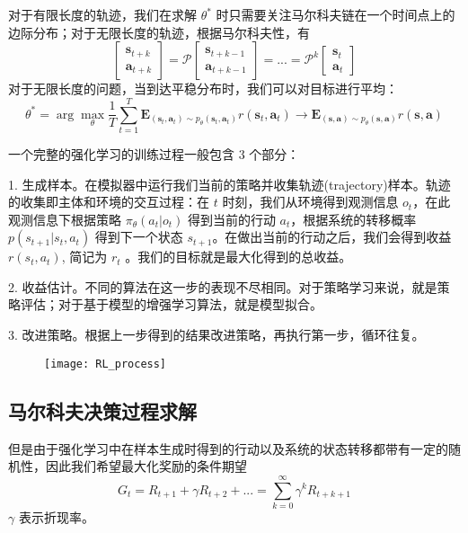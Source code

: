 对于有限长度的轨迹，我们在求解 $\theta^*$ 时只需要关注马尔科夫链在一个时间点上的边际分布；对于无限长度的轨迹，根据马尔科夫性，有
$$\left[\begin{array}{l}\mathbf{s}_{t+k}\\\mathbf{a}_{t+k}\end{array}\right]=\mathcal{P}\left[\begin{array}{l}\mathbf{s}_{t+k-1}\\\mathbf{a}_{t+k-1}\end{array}\right]=...=\mathcal{P}^k\left[\begin{array}{l}\mathbf{s}_{t}\\\mathbf{a}_{t}\end{array}\right]$$
对于无限长度的问题，当到达平稳分布时，我们可以对目标进行平均：
$$
\theta^*=\arg\max_\theta\frac{1}{T}\sum_{t=1}^T\mathbf{E}_{(\mathbf{s}_t,\mathbf{a}_t)\sim p_\theta(\mathbf{s}_t,\mathbf{a}_t)}r(\mathbf{s}_t,\mathbf{a}_t)\rightarrow \mathbf{E}_{(\mathbf{s},\mathbf{a})\sim p_\theta(\mathbf{s},\mathbf{a})}r(\mathbf{s},\mathbf{a})
$$

一个完整的强化学习的训练过程一般包含 3 个部分：

1. 生成样本。在模拟器中运行我们当前的策略并收集轨迹(trajectory)样本。轨迹的收集即主体和环境的交互过程：在 $t$ 时刻，我们从环境得到观测信息 $o_t$，在此观测信息下根据策略 $\pi_\theta(a_t|o_t)$ 得到当前的行动 $a_t$，根据系统的转移概率 $p(s_{t+1}|s_t, a_t)$ 得到下一个状态 $s_{t+1}$。在做出当前的行动之后，我们会得到收益 $r(s_t,a_t)$, 简记为 $r_t$ 。我们的目标就是最大化得到的总收益。

2. 收益估计。不同的算法在这一步的表现不尽相同。对于策略学习来说，就是策略评估；对于基于模型的增强学习算法，就是模型拟合。

3. 改进策略。根据上一步得到的结果改进策略，再执行第一步，循环往复。

\begin{figure}[!htbp]
    \centering
    \texttt{[image: RL\_process]}
    \label{fig:RL_process}
\end{figure}

\subsection{马尔科夫决策过程求解}

但是由于强化学习中在样本生成时得到的行动以及系统的状态转移都带有一定的随机性，因此我们希望最大化奖励的条件期望
\begin{equation}\label{eq:max_expect}
G_t = R_{t+1} + \gamma R_{t+2} + ... = \sum_{k=0}^\infty \gamma^kR_{t+k+1}
\end{equation}
$\gamma$ 表示折现率。

